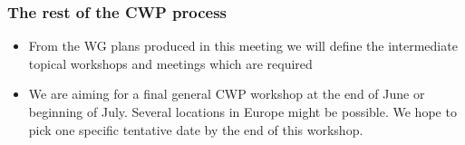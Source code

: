 \begin{frame}
\frametitle{The rest of the CWP process}

\begin{itemize}
\item From the WG plans produced in this meeting we will define the intermediate topical workshops and meetings which are required
\item We are aiming for a final general CWP workshop at the end of June or beginning of July. Several locations in Europe might be possible. We hope to pick one specific tentative date by the end of this workshop.
\end{itemize}

\end{frame}



